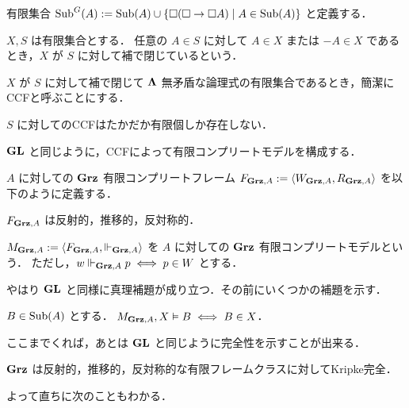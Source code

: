 \documentclass{jlreq}
\begin{document}
\begin{definition}
	有限集合 $\mathrm{Sub}^G(A) := \mathrm{Sub}(A) \cup \{ \Box(\Box \to \Box A) \mid A \in \mathrm{Sub}(A) \}$ と定義する．
\end{definition}

\begin{definition}
	$X, S$ は有限集合とする．
	任意の $A \in S$ に対して $A \in X$ または $-A \in X$ であるとき，$X$ が $S$ に対して補で閉じているという．

	$X$ が $S$ に対して補で閉じて $\mathbf{\Lambda}$ 無矛盾な論理式の有限集合であるとき，簡潔にCCFと呼ぶことにする．
\end{definition}

\begin{lemma}
	$S$ に対してのCCFはたかだか有限個しか存在しない．
\end{lemma}

$\mathbf{GL}$ と同じように，CCFによって有限コンプリートモデルを構成する．
\begin{definition}
	$A$ に対しての $\mathbf{Grz}$ 有限コンプリートフレーム $F_{\mathbf{Grz}, A} := \langle W_{\mathbf{Grz}, A}, R_{\mathbf{Grz}, A} \rangle$ を以下のように定義する．
\end{definition}

\begin{lemma}
	$F_{\mathbf{Grz}, A}$ は反射的，推移的，反対称的．
\end{lemma}

\begin{definition}
	$M_{\mathbf{Grz}, A} := \langle F_{\mathbf{Grz}, A}, \Vdash_{\mathbf{Grz}, A} \rangle$ を $A$ に対しての $\mathbf{Grz}$ 有限コンプリートモデルという．
	ただし，$w \Vdash_{\mathbf{Grz}, A} p \iff p \in W$ とする．
\end{definition}

やはり $\mathbf{GL}$ と同様に真理補題が成り立つ．その前にいくつかの補題を示す．

\begin{lemma}\label{lem:Grz_truthlemma}
	$B \in \mathrm{Sub}(A)$ とする．
	$M_{\mathbf{Grz}, A}, X \vDash B \iff B \in X$．
\end{lemma}

ここまでくれば，あとは $\mathbf{GL}$ と同じように完全性を示すことが出来る．

\begin{theorem}
	$\mathbf{Grz}$ は反射的，推移的，反対称的な有限フレームクラスに対してKripke完全．
\end{theorem}

よって直ちに次のこともわかる．
\end{document}
